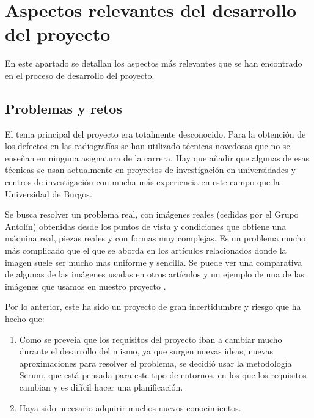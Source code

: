\chapter{Aspectos relevantes del desarrollo del proyecto}

En este apartado se detallan los aspectos más relevantes que se han encontrado en el proceso de desarrollo del proyecto.

\section{Problemas y retos}
El tema principal del proyecto era totalmente desconocido. Para la obtención de los defectos en las radiografías se han utilizado técnicas novedosas que no se enseñan en ninguna asignatura de la carrera. Hay que añadir que algunas de esas técnicas se usan actualmente en proyectos de investigación en universidades y centros de investigación con mucha más experiencia en este campo que la Universidad de Burgos.

Se busca resolver un problema real, con imágenes reales (cedidas por el Grupo Antolín) obtenidas desde los puntos de vista y condiciones que obtiene una máquina real, piezas reales y con formas muy complejas. Es un problema mucho más complicado que el que se aborda en los artículos relacionados donde la imagen suele ser mucho mas uniforme y sencilla. Se puede ver una comparativa de algunas de las imágenes usadas en otros artículos  y un ejemplo de una de las imágenes que usamos en nuestro proyecto .

Por lo anterior, este ha sido un proyecto de gran incertidumbre y riesgo que ha hecho que:

\begin{enumerate}
\item Como se preveía que los requisitos del proyecto iban a cambiar mucho durante el desarrollo del mismo, ya que surgen nuevas ideas, nuevas aproximaciones para resolver el problema, se decidió usar la metodología Scrum, que está pensada para este tipo de entornos, en los que los requisitos cambian y es difícil hacer una planificación.

\item Haya sido necesario adquirir muchos nuevos conocimientos.
\end{enumerate}

